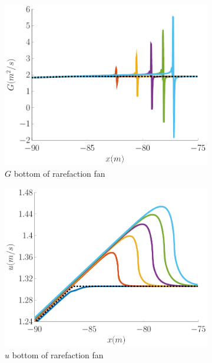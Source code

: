 \documentclass[10pt]{article}
\begin{document}
\begin{figure}
\begin{subfigure}{0.32\textwidth}
	\includegraphics[width=\textwidth]{./Figures/Simulations/Study/RegSWWE/Convergence/GRFBot.pdf}
	\caption{$G$ bottom of rarefaction fan}
	\end{subfigure}
	\begin{subfigure}{0.32\textwidth}
	\centering
	\includegraphics[width=\textwidth]{./Figures/Simulations/Study/RegSWWE/Convergence/uRFBot.pdf}
	\caption{$u$ bottom  of rarefaction fan}
	\end{subfigure}
	\begin{subfigure}{0.32\textwidth}
	\centering

\end{subfigure}
\end{figure}
\end{document}
